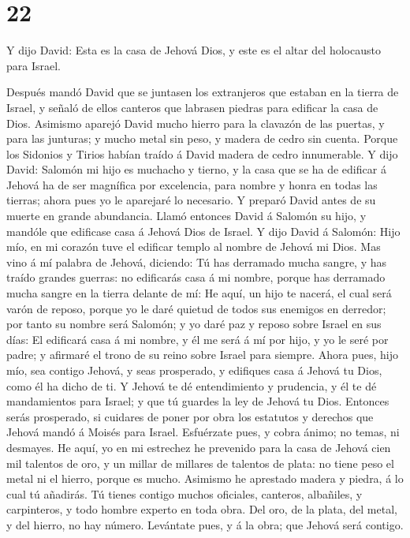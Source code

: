 \hypertarget{section-21}{%
\section{22}\label{section-21}}

 Y dijo David: Esta es la casa de Jehová Dios, y este es el
altar del holocausto para Israel.

 Después mandó David que se juntasen los extranjeros que
estaban en la tierra de Israel, y señaló de ellos canteros que labrasen
piedras para edificar la casa de Dios.  Asimismo aparejó
David mucho hierro para la clavazón de las puertas, y para las junturas;
y mucho metal sin peso, y madera de cedro sin cuenta. 
Porque los Sidonios y Tirios habían traído á David madera de cedro
innumerable.  Y dijo David: Salomón mi hijo es muchacho y
tierno, y la casa que se ha de edificar á Jehová ha de ser magnífica por
excelencia, para nombre y honra en todas las tierras; ahora pues yo le
aparejaré lo necesario. Y preparó David antes de su muerte en grande
abundancia.  Llamó entonces David á Salomón su hijo, y
mandóle que edificase casa á Jehová Dios de Israel.  Y dijo
David á Salomón: Hijo mío, en mi corazón tuve el edificar templo al
nombre de Jehová mi Dios.  Mas vino á mí palabra de Jehová,
diciendo: Tú has derramado mucha sangre, y has traído grandes guerras:
no edificarás casa á mi nombre, porque has derramado mucha sangre en la
tierra delante de mí:  He aquí, un hijo te nacerá, el cual
será varón de reposo, porque yo le daré quietud de todos sus enemigos en
derredor; por tanto su nombre será Salomón; y yo daré paz y reposo sobre
Israel en sus días:  El edificará casa á mi nombre, y él me
será á mí por hijo, y yo le seré por padre; y afirmaré el trono de su
reino sobre Israel para siempre.  Ahora pues, hijo mío, sea
contigo Jehová, y seas prosperado, y edifiques casa á Jehová tu Dios,
como él ha dicho de ti.  Y Jehová te dé entendimiento y
prudencia, y él te dé mandamientos para Israel; y que tú guardes la ley
de Jehová tu Dios.  Entonces serás prosperado, si cuidares
de poner por obra los estatutos y derechos que Jehová mandó á Moisés
para Israel. Esfuérzate pues, y cobra ánimo; no temas, ni desmayes.
 He aquí, yo en mi estrechez he prevenido para la casa de
Jehová cien mil talentos de oro, y un millar de millares de talentos de
plata: no tiene peso el metal ni el hierro, porque es mucho. Asimismo he
aprestado madera y piedra, á lo cual tú añadirás.  Tú
tienes contigo muchos oficiales, canteros, albañiles, y carpinteros, y
todo hombre experto en toda obra.  Del oro, de la plata,
del metal, y del hierro, no hay número. Levántate pues, y á la obra; que
Jehová será contigo.

